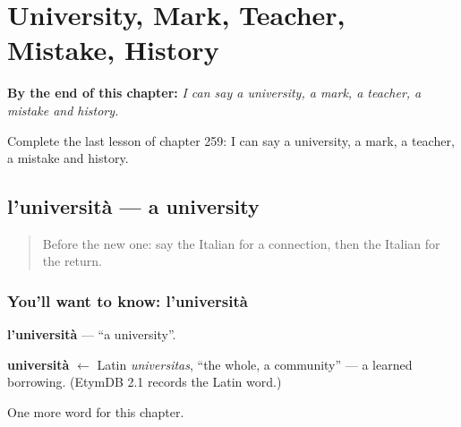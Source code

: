 
\chapter{University, Mark, Teacher, Mistake, History}
\label{ch:it-university-mark-teacher-mistake-history}

\begin{chapteropening}
\textbf{By the end of this chapter:} \emph{I can say a university, a mark, a teacher, a mistake and history.}

Complete the last lesson of chapter 259: I can say a university, a mark, a teacher, a mistake and history.
\end{chapteropening}

\section[l'università]{l'università — a university}

\label{lesson:IT-C259-universita}



\begin{quote}
Before the new one: say the Italian for a connection, then the Italian for the return.
\end{quote}

\subsection*{You'll want to know: l'università}
\textbf{l'università} — \textquotedblleft{}a university\textquotedblright{}.

\begin{cousinweb}
\textbf{università} $\leftarrow$ Latin \emph{universitas}, \textquotedblleft{}the whole, a community\textquotedblright{} — a learned borrowing. (EtymDB 2.1 records the Latin word.)
\end{cousinweb}

\begin{grammarlens}[title={What you've built}]
One more word for this chapter.
\end{grammarlens}

